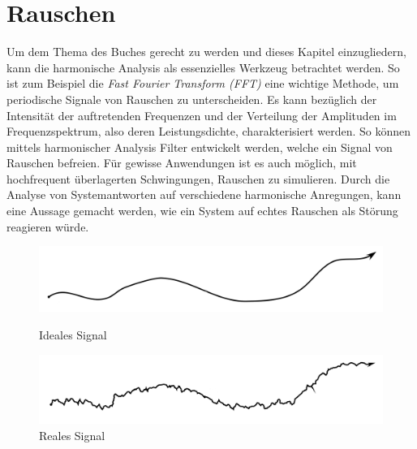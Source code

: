 %
%
%
%

\section{Rauschen\label{brown:Rauschen}}

Um dem Thema des Buches gerecht zu werden und dieses Kapitel einzugliedern, kann die harmonische Analysis als essenzielles Werkzeug betrachtet werden. So ist zum Beispiel die \textit{Fast Fourier Transform (FFT)} eine wichtige Methode, um periodische Signale von Rauschen zu unterscheiden. Es kann bezüglich der Intensität der auftretenden Frequenzen und der Verteilung der Amplituden im Frequenzspektrum, also deren Leistungsdichte, charakterisiert werden. 
So können mittels harmonischer Analysis Filter entwickelt werden, welche ein Signal von Rauschen befreien. Für gewisse Anwendungen ist es auch möglich, mit hochfrequent überlagerten Schwingungen, Rauschen zu simulieren. Durch die Analyse von Systemantworten auf verschiedene harmonische Anregungen, kann eine Aussage gemacht werden, wie ein System auf echtes Rauschen als Störung reagieren würde. 

\begin{figure}
	\centering
	\begin{minipage}{0.48\textwidth}
		\centering
		\includegraphics[width=\textwidth]{papers/brown/images/idealSignal2.png}
		\caption{Ideales Signal}
		\label{idealSignal}
	\end{minipage}
	\begin{minipage}{0.48\textwidth}
		\centering
		\includegraphics[width=\textwidth]{papers/brown/images/realSignal2.png}
		\caption{Reales Signal}
		\label{realSignal}
	\end{minipage}
\end{figure}

